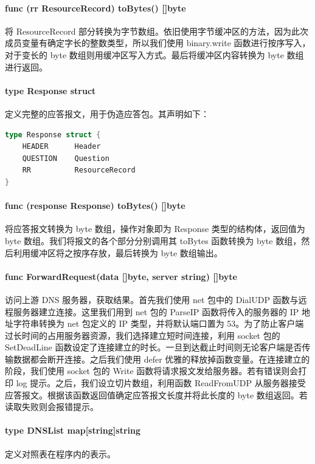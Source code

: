 \documentclass[blue,normal,cn]{elegantnote}
\begin{document}
\paragraph{func (rr ResourceRecord) toBytes() []byte} 将 ResourceRecord 部分转换为字节数组。依旧使用字节缓冲区的方法，因为此次成员变量有确定字长的整数类型，所以我们使用 binary.write 函数进行按序写入，对于变长的 byte 数组则用缓冲区写入方式。最后将缓冲区内容转换为 byte 数组进行返回。

\paragraph{type Response struct} 定义完整的应答报文，用于伪造应答包。其声明如下：
\begin{lstlisting}[language=go]
type Response struct {
	HEADER   	Header
	QUESTION 	Question
	RR       	ResourceRecord
}
\end{lstlisting}

\paragraph{func (response Response) toBytes() []byte} 将应答报文转换为 byte 数组，操作对象即为 Response 类型的结构体，返回值为 byte 数组。我们将报文的各个部分分别调用其 toBytes 函数转换为 byte 数组，然后利用缓冲区将之按序存放，最后转换为 byte 数组输出。

\paragraph{func ForwardRequest(data []byte, server string) []byte} 访问上游 DNS 服务器，获取结果。首先我们使用 net 包中的 DialUDP 函数与远程服务器建立连接。这里我们用到 net 包的 ParseIP 函数将传入的服务器的 IP 地址字符串转换为 net 包定义的 IP 类型，并将默认端口置为 53。为了防止客户端过长时间的占用服务器资源，我们选择建立短时间连接，利用 socket 包的 SetDeadLine 函数设定了连接建立的时长。一旦到达截止时间则无论客户端是否传输数据都会断开连接。之后我们使用 defer 优雅的释放掉函数变量。在连接建立的阶段，我们使用 socket 包的 Write 函数将请求报文发给服务器。若有错误则会打印 log 提示。之后，我们设立切片数组，利用函数 ReadFromUDP 从服务器接受应答报文。根据该函数返回值确定应答报文长度并将此长度的 byte 数组返回。若读取失败则会报错提示。

\paragraph{type DNSList map[string]string} 定义对照表在程序内的表示。
\end{document}
